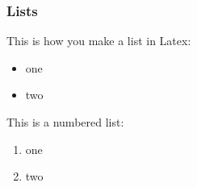 \documentclass[../main.tex]{subfiles}
\begin{document}
\subsubsection{Lists}

This is how you make a list in Latex:

\begin{itemize}
    \item one
    \item two
\end{itemize}

This is a numbered list:

\begin{enumerate}
    \item one
    \item two
\end{enumerate}
\end{document}
